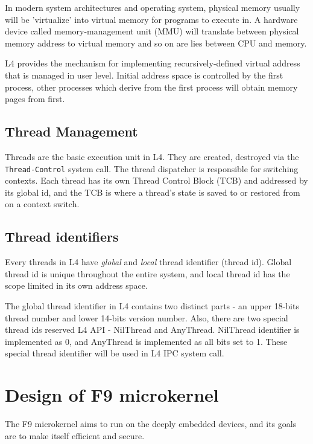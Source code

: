 \documentclass[10pt,preprint,nocopyrightspace]{sigplanconf}
\begin{document}
In modern system architectures and operating system, physical memory usually will be 'virtualize' into virtual memory for programs to execute in\cite{arpaci2015operating}. A hardware device called memory-management unit (MMU) will translate between physical memory address to virtual memory and so on are lies between CPU and memory.

L4 provides the mechanism for implementing recursively-defined virtual address that is managed in user level\cite{dannowski2011l4}. Initial address space is controlled by the first process, other processes which derive from the first process will obtain memory pages from first.

\subsection{Thread Management}

Threads are the basic execution unit in L4. They are created, destroyed via the \verb|Thread-Control| system call\cite{nourai2005aphysically}. The thread dispatcher is responsible for switching contexts. Each thread has its own Thread Control Block (TCB) and addressed by its global id, and the TCB is where a thread's state is saved to or restored from on a context switch\cite{nourai2005aphysically}.

\subsection{Thread identifiers}

Every threads in L4 have \textit{global} and \textit{local} thread identifier (thread id). Global thread id is unique throughout the entire system, and local thread id has the scope limited in its own address space.

The global thread identifier in L4 contains two distinct parts - an upper 18-bits thread number and lower 14-bits version number. Also, there are two special thread ids reserved L4 API - NilThread and AnyThread. NilThread identifier is implemented as 0, and AnyThread is implemented as all bits set to 1. These special thread identifier will be used in L4 IPC system call\cite{nourai2005aphysically}.

\section{Design of F9 microkernel}

The F9 microkernel aims to run on the deeply embedded devices, and its goals are to make itself efficient and secure.
\end{document}
